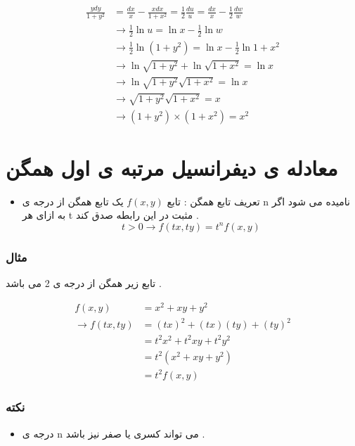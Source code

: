 \documentclass[12pt]{book}
\begin{document}
\begin{align*}
\frac{ydy}{1+y^{2}} &= \frac{dx}{x} - \frac{xdx}{1+x^{2}} = \frac{1}{2} \frac{du}{u} = \frac{dx}{x} - \frac{1}{2} \frac{dw}{w} \\
&\to \frac{1}{2} \ln{u} = \ln{x} - \frac{1}{2} \ln{w} \\
&\to \frac{1}{2} \ln{(1+y^{2})} = \ln{x} - \frac{1}{2} \ln{1+x^{2}} \\
&\to \ln{\sqrt{1+y^{2}}} + \ln{\sqrt{1+x^{2}}} = \ln{x} \\
&\to  \ln{\sqrt{1+y^{2}} \sqrt{1+x^{2}}} = \ln{x} \\
&\to \sqrt{1+y^{2}} \sqrt{1+x^{2}} = x \\
&\to (1+y^{2}) \times (1+x^{2}) = x^{2}
\end{align*}


\section{معادله ی دیفرانسیل مرتبه ی اول همگن}

\begin{tcolorbox}
\begin{itemize}
	\item تعریف تابع همگن :
	تابع $f(x,y)$
	یک تابع همگن از درجه ی n نامیده می شود اگر به ازای هر t مثبت در این رابطه صدق کند .
	$$
	t > 0 \to f(tx,ty) = t^{n} f(x,y)
	$$
\end{itemize}
\end{tcolorbox}


\subsubsection{مثال}

تابع زیر همگن از درجه ی 2 می باشد .


\begin{align*}
f(x,y) &= x^{2} + xy + y^{2} \\
\to f(tx,ty) &= (tx)^{2} + (tx)(ty) + (ty)^{2} \\
&= t^{2}x^{2} + t^{2}xy + t^{2}y^{2} \\
&= t^{2} \left( x^{2} + xy + y^{2} \right)  \\
&= t^{2} f(x,y)
\end{align*}


\subsubsection{نکته}

\begin{tcolorbox}
\begin{itemize}
	\item درجه ی n می تواند
	کسری یا صفر نیز باشد .
\end{itemize}
\end{tcolorbox}
\end{document}
